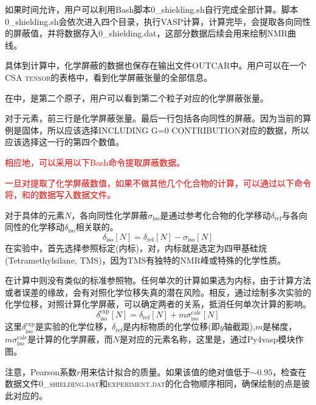 如果时间允许，用户可以利用\textrm{Bash}脚本\textrm{0\_shielding.sh}自行完成全部计算。脚本\textrm{0\_shielding.sh}会依次进入四个目录，执行\textrm{VASP}计算，计算完毕，会提取各向同性的屏蔽值，并将数据存入\textrm{0\_shielding.dat}，这部分数据后续会用来绘制\textrm{NMR}曲线。

具体到计算中，化学屏蔽的数据也保存在输出文件\textrm{OUTCAR}中。用户可以在一个\textsc{CSA tensor}的表格中，看到化学屏蔽张量的全部信息。

在中，是第二个原子，用户可以看到第二个粒子对应的化学屏蔽张量。


对于元素，前三行是化学屏蔽张量。最后一行包括各向同性的屏蔽。因为当前的算例是固体，所以应该选择\textsc{INCLUDING G=0 CONTRIBUTION}对应的数据，所以应该选择这一行的第四个数值。

\textcolor{red}{相应地，可以采用以下\textrm{Bash}命令提取屏蔽数据。

一旦对提取了化学屏蔽数值，如果不做其他几个化合物的计算，可以通过以下命令将，和的数据写入数据文件。}

对于具体的元素$N$，各向同性化学屏蔽$\sigma_{\mathrm{iso}}$是通过参考化合物的化学移动$\delta_{\mathrm{ref}}$与各向同性的化学移动$\delta_{\mathrm{iso}}$相关联的。
\begin{displaymath}
	\delta_{\mathrm{iso}}[N]=\delta_{\mathrm{ref}}[N]-\sigma_{\mathrm{iso}}[N]
\end{displaymath}
在实验中，首先选择参照标定(内标)，对，内标就是选定为四甲基硅烷\textrm{(Tetramethylsilane, TMS)}，因为\textrm{TMS}有独特的\textrm{NMR}峰或特殊的化学性质。

在计算中则没有类似的标准参照物。任何单次的计算如果选为内标，由于计算方法或者误差的缘故，会有对照化学位移失真的潜在风险。相反，通过绘制多次实验的化学位移，对照计算化学屏蔽，可以确定两者的关系，抵消任何单次计算的影响。
\begin{displaymath}
	\delta_{\mathrm{iso}}^{\mathrm{exp}}[N]=\delta_{\mathrm{ref}}[N]+m\sigma_{\mathrm{iso}}^{\mathrm{calc}}[N]
\end{displaymath}
这里$\delta_{\mathrm{iso}}^{\mathrm{exp}}$是实验的化学位移，$\delta_{\mathrm{ref}}$是内标物质的化学位移(即$y$轴截距),$m$是梯度，$m\sigma_{\mathrm{iso}}^{\mathrm{calc}}$是计算的化学屏蔽，而$N$是对应的元素名称，这里是，通过\textrm{Py4vasp}模块作图。

注意，\textrm{Pearson}系数$r$用来估计拟合的质量。如果该值的绝对值低于$\sim0.95$，检查在数据文件\textsc{0\_shielding.dat}和\textsc{experiment.dat}的化合物顺序相同，确保绘制的点是彼此对应的。

